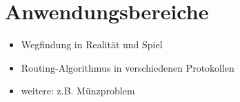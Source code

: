 \section{Anwendungsbereiche}

\begin{frame}
	\begin{itemize}
		\item<2-> Wegfindung in Realität und Spiel
		\item<3-> Routing-Algorithmus in verschiedenen Protokollen
		\item<4> weitere: z.B. Münzproblem
	\end{itemize}
\end{frame}